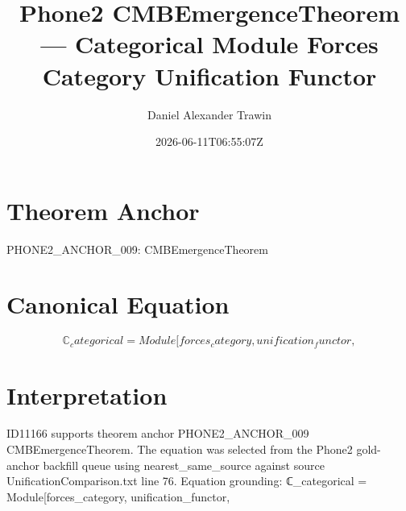 \documentclass[11pt]{article}
\title{Phone2 CMBEmergenceTheorem — Categorical Module Forces Category Unification Functor}
\author{Daniel Alexander Trawin}
\date{2026-06-11T06:55:07Z}
\begin{document}
\maketitle
\section*{Theorem Anchor}
PHONE2_ANCHOR_009: CMBEmergenceTheorem
\section*{Canonical Equation}
\[
ℂ_categorical = Module[{forces_category, unification_functor},
\]
\section*{Interpretation}
ID11166 supports theorem anchor PHONE2_ANCHOR_009 CMBEmergenceTheorem. The equation was selected from the Phone2 gold-anchor backfill queue using nearest_same_source against source UnificationComparison.txt line 76. Equation grounding: ℂ_categorical = Module[{forces_category, unification_functor},
\end{document}
